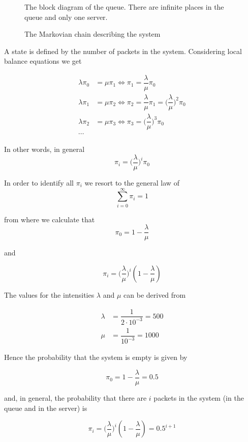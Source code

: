 \begin{figure}[H]
	\centering
	\scalebox{0.8}{}
	\caption{The block diagram of the queue. There are infinite places in the
    queue and only one server.}
\end{figure}

\begin{figure}[H]
	\centering
	\scalebox{1}{}
	\caption{The Markovian chain describing the system}
\end{figure}

A state is defined by the number of packets in the system. Considering local
balance equations we get

\begin{align*}
  \lambda \pi_0 &= \mu \pi_1 \Leftrightarrow \pi_1 = \dfrac{\lambda}{\mu}\pi_0\\
  \lambda \pi_1 &= \mu \pi_2 \Leftrightarrow \pi_2 = \dfrac{\lambda}{\mu}\pi_1 = \Big(\dfrac{\lambda}{\mu}\Big)^2\pi_0\\
  \lambda \pi_2 &= \mu \pi_3 \Leftrightarrow \pi_3 = \Big(\dfrac{\lambda}{\mu}\Big)^3\pi_0\\
  \cdots
\end{align*}

In other words, in general $$\pi_i = \Big(\dfrac{\lambda}{\mu}\Big)^i\pi_0$$

In order to identify all $\pi_i$ we resort to the general law of
$$\sum_{i=0}^{\infty} \pi_i = 1$$

from where we calculate that
$$\pi_0 = 1 - \dfrac{\lambda}{\mu}$$

and

$$\pi_i = \Big(\dfrac{\lambda}{\mu}\Big)^i(1 - \dfrac{\lambda}{\mu})$$

The values for the intensities $\lambda$ and $\mu$ can be derived from

\begin{align*}
  \lambda &= \dfrac{1}{2 \cdot 10^{-3}} = 500 \\
  \mu     &= \dfrac{1}{10^{-3}} = 1000
\end{align*}

Hence the probability that the system is empty is given by

$$\pi_0 = 1 - \dfrac{\lambda}{\mu} = 0.5$$

and, in general, the probability that there are $i$ packets in the system
(in the queue and in the server) is

$$\pi_i = \Big(\dfrac{\lambda}{\mu}\Big)^i(1 - \dfrac{\lambda}{\mu}) = 0.5^{i+1}$$


